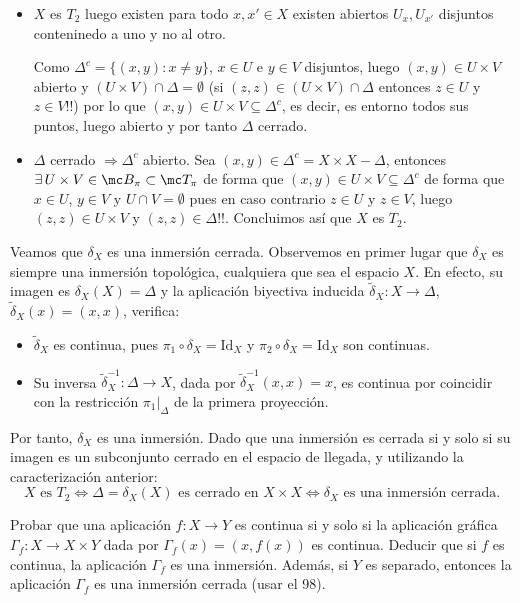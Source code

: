 \begin{sol}
    \begin{itemize}
        \item[$\Rightarrow)$] $X$ es $T_2$ luego existen para todo $x,x' \in X$ existen abiertos $U_x, U_{x'}$ disjuntos conteninedo a uno y no al otro. 

    Como $\Delta^c = \{(x,y ):x\neq y \}$, $x\in U$ e $y\in V$ disjuntos, luego $(x,y) \in U\times V$ abierto y $(U\times V) \cap \Delta = \emptyset$ (si $(z,z) \in (U\times V)\cap \Delta$ entonces $z\in U$ y $z \in V$!!) por lo que $(x,y) \in U\times V \subseteq \Delta^c$, es decir, es entorno todos sus puntos, luego abierto y por tanto $\Delta$ cerrado.
    
    \item[$\Leftarrow)$] $\Delta$ cerrado $\Rightarrow \Delta^c$ abierto. Sea $(x,y) \in \Delta^c = X \times X - \Delta$, entonces $\exists \, U\times V \in \mc B_{\pi} \subset \mc T_{\pi}$ de forma que $(x,y) \in U\times V \subseteq \Delta^c$ de forma que $x\in U$, $y\in V$ y $U \cap V = \emptyset$ pues en caso contrario $z\in U$ y $z\in V$, luego $(z,z) \in U\times V$ y $(z,z) \in \Delta !!$. Concluimos as\'i que $X$ es $T_2$. 
    \end{itemize}    

    Veamos que $\delta_X$ es una inmersi\'on cerrada. Observemos en primer lugar que $\delta_X$ es siempre una inmersión topológica, cualquiera que sea el espacio $X$. En efecto, su imagen es $\delta_X(X) = \Delta$ y la aplicación biyectiva inducida $\tilde{\delta}_X : X \to \Delta$, $\tilde{\delta}_X(x) = (x,x)$, verifica:
    \begin{itemize}
        \item $\tilde{\delta}_X$ es continua, pues $\pi_1 \circ \delta_X = \mathrm{Id}_X$ y $\pi_2 \circ \delta_X = \mathrm{Id}_X$ son continuas.
        \item Su inversa $\tilde{\delta}_X^{-1} : \Delta \to X$, dada por $\tilde{\delta}_X^{-1}(x,x) = x$, es continua por coincidir con la restricción $\pi_1|_{\Delta}$ de la primera proyección.
    \end{itemize}
    Por tanto, $\delta_X$ es una inmersión. Dado que una inmersión es cerrada si y solo si su imagen es un subconjunto cerrado en el espacio de llegada, y utilizando la caracterización anterior:
    \[
        X \text{ es } T_2 \iff \Delta = \delta_X(X) \text{ es cerrado en } X \times X \iff \delta_X \text{ es una inmersión cerrada.}
    \]
\end{sol}
\begin{ejer}
    [99] Probar que una aplicación $f : X \to Y$ es continua si y solo si la aplicación gráfica $\Gamma_f : X \to X \times Y$ dada por $\Gamma_f(x) = (x, f(x))$ es continua. Deducir que si $f$ es continua, la aplicación $\Gamma_f$ es una inmersión. Además, si $Y$ es separado, entonces la aplicación $\Gamma_f$ es una inmersión cerrada (usar el 98).
\end{ejer}
